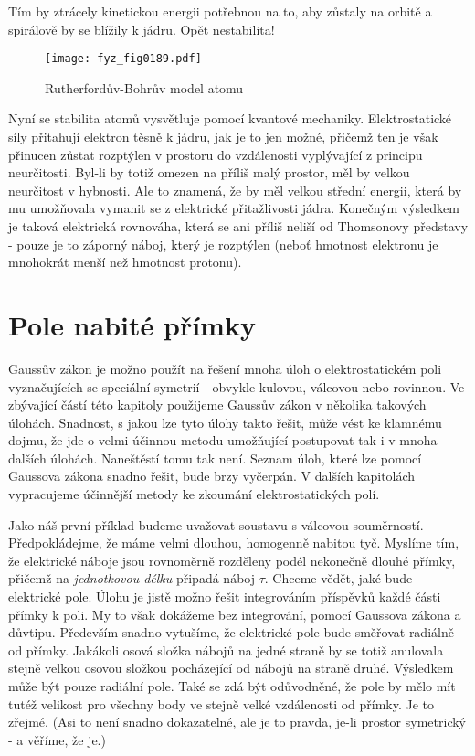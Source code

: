   Tím by ztrácely kinetickou energii potřebnou na to, aby zůstaly na orbitě a spirálově by se 
  blížily k jádru. Opět nestabilita!
  \begin{figure}[ht!] %
    \centering
    \texttt{[image: fyz\_fig0189.pdf]}
    \caption{Rutherfordův-Bohrův model atomu}
    \label{fyz:fig0189}
  \end{figure}      
  
  Nyní se stabilita atomů vysvětluje pomocí kvantové mechaniky. Elektrostatické síly přitahují
  elektron těsně k jádru, jak je to jen možné, přičemž ten je však přinucen zůstat rozptýlen v
  prostoru do vzdálenosti vyplývající z principu neurčitosti. Byl-li by totiž omezen na příliš malý
  prostor, měl by velkou neurčitost v hybnosti. Ale to znamená, že by měl velkou střední energii,
  která by mu umožňovala vymanit se z elektrické přitažlivosti jádra. Konečným výsledkem je taková
  elektrická rovnováha, která se ani příliš neliší od Thomsonovy představy - pouze je to záporný
  náboj, který je rozptýlen (neboť hmotnost elektronu je mnohokrát menší než hmotnost protonu).

\section{Pole nabité přímky}\label{fyz:IIchapVsecIV}
  Gaussův zákon je možno použít na řešení mnoha úloh o elektrostatickém poli vyznačujících se
  speciální symetrií - obvykle kulovou, válcovou nebo rovinnou. Ve zbývající částí této kapitoly
  použijeme Gaussův zákon v několika takových úlohách. Snadnost, s jakou lze tyto úlohy takto řešit,
  může vést ke klamnému dojmu, že jde o velmi účinnou metodu umožňující postupovat tak i v mnoha
  dalších úlohách. Naneštěstí tomu tak není. Seznam úloh, které lze pomocí Gaussova zákona snadno
  řešit, bude brzy vyčerpán. V dalších kapitolách vypracujeme účinnější metody ke zkoumání
  elektrostatických polí.
  
  Jako náš první příklad budeme uvažovat soustavu s válcovou souměrností. Předpokládejme, že máme
  velmi dlouhou, homogenně nabitou tyč. Myslíme tím, že elektrické náboje jsou rovnoměrně rozděleny
  podél nekonečně dlouhé přímky, přičemž na \emph{jednotkovou délku} připadá náboj \(\tau\). Chceme
  vědět, jaké bude elektrické pole. Úlohu je jistě možno řešit integrováním příspěvků každé části
  přímky k poli. My to však dokážeme bez integrování, pomocí Gaussova zákona a důvtipu. Především
  snadno vytušíme, že elektrické pole bude směřovat radiálně od přímky. Jakákoli osová složka nábojů
  na jedné straně by se totiž anulovala stejně velkou osovou složkou pocházející od nábojů na straně
  druhé. Výsledkem může být pouze radiální pole. Také se zdá být odůvodněné, že pole by mělo mít
  tutéž velikost pro všechny body ve stejně velké vzdálenosti od přímky. Je to zřejmé. (Asi to není
  snadno dokazatelné, ale je to pravda, je-li prostor symetrický - a věříme, že je.)
  

